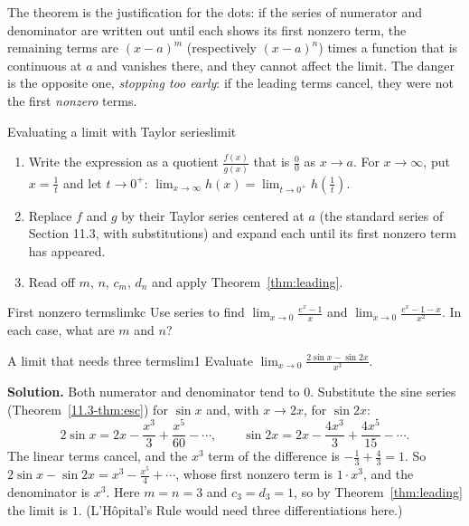 \documentclass[11pt]{article}
\begin{document}
The theorem is the justification for the dots: if the series of numerator and denominator are written out until each shows its first nonzero term, the remaining terms are $(x-a)^m$ (respectively $(x-a)^n$) times a function that is continuous at $a$ and vanishes there, and they cannot affect the limit. The danger is the opposite one, \emph{stopping too early}: if the leading terms cancel, they were not the first \emph{nonzero} terms.

\begin{proc}{Evaluating a limit with Taylor series}{limit}
\begin{enumerate}[nosep]
  \item Write the expression as a quotient $\frac{f(x)}{g(x)}$ that is $\frac00$ as $x\to a$. For $x\to\infty$, put $x=\frac1t$ and let $t\to0^+$: $\lim_{x\to\infty}h(x)=\lim_{t\to0^+}h\left(\frac1t\right)$.
  \item Replace $f$ and $g$ by their Taylor series centered at $a$ (the standard series of Section 11.3, with substitutions) and expand each until its first nonzero term has appeared.
  \item Read off $m$, $n$, $c_m$, $d_n$ and apply Theorem~\ref{thm:leading}.
\end{enumerate}
\end{proc}

\begin{kc}{First nonzero terms}{limkc}
Use series to find $\displaystyle\lim_{x\to0}\frac{e^x-1}x$ and $\displaystyle\lim_{x\to0}\frac{e^x-1-x}{x^2}$. In each case, what are $m$ and $n$?
\end{kc}

\begin{exmp}{A limit that needs three terms}{lim1}
Evaluate $\displaystyle\lim_{x\to0}\frac{2\sin x-\sin2x}{x^3}$.

\textbf{Solution.} Both numerator and denominator tend to $0$. Substitute the sine series (Theorem~\ref{11.3-thm:esc}) for $\sin x$ and, with $x\to2x$, for $\sin2x$:
\[
2\sin x=2x-\frac{x^3}3+\frac{x^5}{60}-\cdots,\qquad\sin2x=2x-\frac{4x^3}3+\frac{4x^5}{15}-\cdots .
\]
The linear terms cancel, and the $x^3$ term of the difference is $-\frac13+\frac43=1$. So $2\sin x-\sin2x=x^3-\frac{x^5}4+\cdots$, whose first nonzero term is $1\cdot x^3$, and the denominator is $x^3$. Here $m=n=3$ and $c_3=d_3=1$, so by Theorem~\ref{thm:leading} the limit is $1$.
(L'H\^opital's Rule would need three differentiations here.)
\end{exmp}
\end{document}
